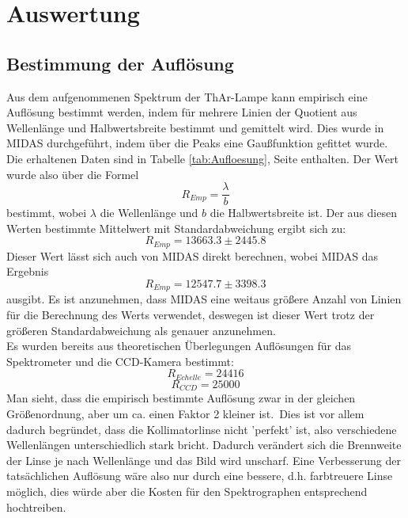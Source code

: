 \section{Auswertung}
\subsection{Bestimmung der Auflösung}
Aus dem aufgenommenen Spektrum der ThAr-Lampe kann empirisch eine Auflösung bestimmt werden, indem für mehrere Linien der Quotient aus Wellenlänge und Halbwertsbreite bestimmt und gemittelt wird. Dies wurde in MIDAS durchgeführt, indem über die Peaks eine Gaußfunktion gefittet wurde. Die erhaltenen Daten sind in Tabelle \ref{tab:Aufloesung}, Seite  \pageref{tab:Aufloesung} enthalten. Der Wert wurde also über die Formel
\begin{equation}
R_{Emp} = \frac{\lambda}{b}
\end{equation}
bestimmt, wobei $\lambda$ die Wellenlänge und $b$ die Halbwertsbreite ist. Der aus diesen Werten bestimmte Mittelwert mit Standardabweichung ergibt sich zu:
\begin{equation}
R_{Emp} = 13663.3 \pm 2445.8
\end{equation}
Dieser Wert lässt sich auch von MIDAS direkt berechnen, wobei MIDAS das Ergebnis
\begin{equation}
R_{Emp} = 12547.7 \pm 3398.3
\end{equation}
ausgibt. Es ist anzunehmen, dass MIDAS eine weitaus größere Anzahl von Linien für die Berechnung des Werts verwendet, deswegen ist dieser Wert trotz der größeren Standardabweichung als genauer anzunehmen.
\\
Es wurden bereits aus theoretischen Überlegungen Auflösungen für das Spektrometer und die CCD-Kamera bestimmt:
\begin{equation}
R_{Echelle} = 24416
\end{equation}
\begin{equation}
R_{CCD} =  25000
\end{equation}
Man sieht, dass die empirisch bestimmte Auflösung zwar in der gleichen Größenordnung, aber um ca. einen Faktor 2 kleiner ist.\
Dies ist vor allem dadurch begründet, dass die Kollimatorlinse nicht 'perfekt' ist, also verschiedene Wellenlängen unterschiedlich stark bricht. Dadurch verändert sich die Brennweite der Linse je nach Wellenlänge und das Bild wird unscharf. Eine Verbesserung der tatsächlichen Auflösung wäre also nur durch eine bessere, d.h. farbtreuere Linse möglich, dies würde aber die Kosten für den Spektrographen entsprechend hochtreiben.

